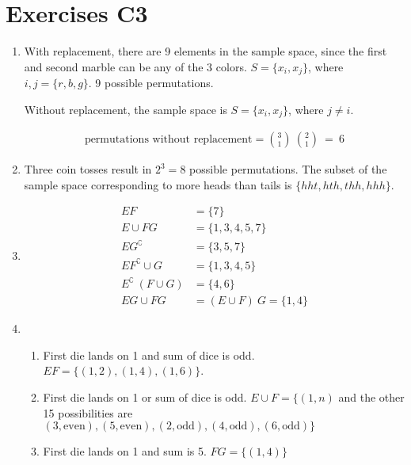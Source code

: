 \chapter*{Exercises C3}

\begin{enumerate}
	\item With replacement, there are 9 elements in the sample space, since the first and second marble can be any of the 3 colors. $ S = \{ x_i, x_j \} $, where $ i, j = \{ r, b, g \} $. 9 possible permutations.
	
	Without replacement, the sample space is $ S = \{ x_i, x_j \} $, where $ j \neq i $.
	
	\begin{align}
		\text{permutations without replacement} =  \binom{3}{1} \ \binom{2}{1} \ = \ 6
	\end{align}
	
	\item Three coin tosses result in $ 2^3  = 8$ possible permutations. The subset of the sample space corresponding to more heads than tails is $ \{ hht, hth, thh, hhh \} $.
	
	\item 	\begin{subequations}
		\begin{align}
			E F &= \{ 7 \} \\
			E \cup FG &= \{ 1, 3, 4, 5, 7 \} \\
			E G^\complement &= \{ 3, 5, 7 \} \\
			E F^\complement \cup G &= \{ 1, 3, 4, 5 \} \\
			E^\complement \  ( F \cup G ) &= \{ 4, 6 \} \\
			EG \cup FG &= (E \cup F) \ G = \{ 1, 4 \}
		\end{align}	
	\end{subequations}
	
	\item \begin{enumerate}
		\item First die lands on 1 and sum of dice is odd. $ EF  = \{ (1,2), (1,4), (1,6) \}$.
		
		\item First die lands on 1 or sum of dice is odd. $ E \cup F = \{ (1, n) $ and the other 15 possibilities are $ (3, \text{even}), (5, \text{even}), (2, \text{odd}), (4, \text{odd}), (6, \text{odd}) \} $ \\
		
		\item First die lands on 1 and sum is 5. $ FG = \{ (1,4) \} $ \\
		

\end{enumerate}
\end{enumerate}
